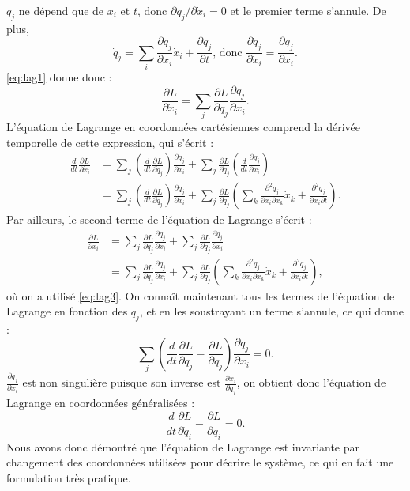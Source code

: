 $q_j$ ne dépend que de $x_i$ et $t$, donc ${\partial q_j}/{\partial \dot{x}_i}=0$ et le premier terme s'annule. De plus,
\begin{equation}
\dot{q}_j = \sum_i \frac{\partial q_j}{\partial x_i}\dot{x}_i+\frac{\partial q_j}{\partial t}\text{,  donc  }
\frac{\partial \dot{q}_j}{\partial \dot{x}_i}=\frac{\partial q_j}{\partial x_i}.
\label{eq:lag3}
\end{equation}
\ref{eq:lag1} donne donc :
\begin{equation}
\label{eq:lag2}
\frac{\partial L}{\partial \dot{x}_i} = \sum_j\frac{\partial L}{\partial \dot{q}_j}\frac{\partial q_j}{\partial x_i}.
\end{equation}
L'équation de Lagrange en coordonnées cartésiennes comprend la dérivée temporelle de cette expression, qui s'écrit :
\begin{align}
\frac{d}{dt}\frac{\partial L}{\partial \dot{x}_i} &= 
\sum_j\left(\frac{d}{dt}\frac{\partial L}{\partial \dot{q}_j}\right)\frac{\partial q_j}{\partial x_i}+
\sum_j\frac{\partial L}{\partial \dot{q}_j}\left(\frac{d}{dt}\frac{\partial q_j}{\partial x_i}\right) \\
&=\sum_j \left(\frac{d}{dt}\frac{\partial L}{\partial \dot{q}_j}\right)\frac{\partial q_j}{\partial x_i}+\sum_j\frac{\partial L}{\partial \dot{q}_j}\left(\sum_k \frac{\partial^2q_j}{\partial x_i \partial x_k}\dot{x}_k + \frac{\partial^2q_j}{\partial x_i \partial t}\right).
\end{align}
Par ailleurs, le second terme de l'équation de Lagrange s'écrit :
\begin{align}
\frac{\partial L}{\partial x_i}&= \sum_j \frac{\partial L}{\partial q_j} \frac{\partial q_j}{\partial x_i}+ \sum_j\frac{\partial L}{\partial \dot{q}_j}\frac{\partial \dot{q}_j}{\partial x_i} \\
&=\sum_j \frac{\partial L}{\partial q_j} \frac{\partial q_j}{\partial x_i}+ \sum_j\frac{\partial L}{\partial \dot{q}_j}\left(\sum_k \frac{\partial^2q_j}{\partial x_i \partial x_k}\dot{x}_k + \frac{\partial^2q_j}{\partial x_i \partial t}\right),
\end{align}
où on a utilisé \ref{eq:lag3}. On connaît maintenant tous les termes de l'équation de Lagrange en fonction des ${q_j}$, et en les soustrayant un terme s'annule, ce qui donne :
\begin{equation}
\sum_j\left(\frac{d}{dt}\frac{\partial L}{\partial \dot{q}_j}-\frac{\partial L}{\partial q_j}\right)\frac{\partial q_j}{\partial x_i}=0.
\end{equation}
$\frac{\partial q_j}{\partial x_i}$ est non singulière puisque son inverse est $\frac{\partial x_i}{\partial q_j}$, on obtient donc l'équation de Lagrange en coordonnées généralisées : 
\begin{equation}
\label{eq:lagq}
\frac{d}{dt}\frac{\partial L}{\partial \dot{q}_i}-\frac{\partial L}{\partial q_i}=0.
\end{equation}
Nous avons donc démontré que l'équation de Lagrange est invariante par changement des coordonnées utilisées pour décrire le système, ce qui en fait une formulation très pratique. 

